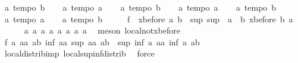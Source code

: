 \begin{isabellebody}
\ a{}{\isacharcolon}\ {\isachardoublequoteopen}tempo{}\ b{\isachardoublequoteclose}\isanewline
\ \ \isamarkupfalse%
\ a{}{\isacharcolon}\ {\isachardoublequoteopen}tempo{}\ a{\isachardoublequoteclose}\isanewline
\ \ \isamarkupfalse%
\ a{}{\isacharcolon}\ {\isachardoublequoteopen}tempo{}\ b{\isachardoublequoteclose}\isanewline
\ \ \isamarkupfalse%
\ a{}{\isacharcolon}\ {\isachardoublequoteopen}tempo{}\ a{\isachardoublequoteclose}\isanewline
\ \ \isamarkupfalse%
\ a{}{\isacharcolon}\ {\isachardoublequoteopen}tempo{}\ b{\isachardoublequoteclose}\isanewline
\ \ \isamarkupfalse%
\ a{}{\isacharcolon}\ {\isachardoublequoteopen}tempo{}\ a{\isachardoublequoteclose}\isanewline
\ \ \isamarkupfalse%
\ a{}{\isacharcolon}\ {\isachardoublequoteopen}tempo{}\ b{\isachardoublequoteclose}\isanewline
\ \ \isamarkupfalse%
\ \isamarkupfalse%
\ f{}{}{\isacharcolon}\ {\isachardoublequoteopen}{\isacharminus}\ xbefore\ a\ b\ {\isacharequal}\ sup\ {\isacharparenleft}sup\ {\isacharparenleft}{\isacharminus}\ a{\isacharparenright}\ {\isacharparenleft}{\isacharminus}\ b{\isacharparenright}{\isacharparenright}\ {\isacharparenleft}xbefore\ b\ a{\isacharparenright}{\isachardoublequoteclose}\isanewline
\ \ \ \ \isamarkupfalse%
\ a{}\ a{}\ a{}\ a{}\ a{}\ a{}\ a{}\ a{}\ \isamarkupfalse%
\ {\isacharparenleft}meson\ local{\isachardot}not{\isacharunderscore}xbefore{\isacharparenright}\isanewline
\ \ \isamarkupfalse%
\ f{}{}{\isacharcolon}\ {\isachardoublequoteopen}{\isasymforall}a\ aa\ ab{\isachardot}\ inf\ {\isacharparenleft}a{\isacharcolon}{\isacharcolon}{\isacharprime}a{\isacharparenright}\ {\isacharparenleft}sup\ aa\ ab{\isacharparenright}\ {\isacharequal}\ sup\ {\isacharparenleft}inf\ a\ aa{\isacharparenright}\ {\isacharparenleft}inf\ a\ ab{\isacharparenright}{\isachardoublequoteclose}\isanewline
\ \ \ \ \isamarkupfalse%
\ local{\isachardot}distrib{\isacharunderscore}imp{}\ local{\isachardot}sup{\isacharunderscore}inf{\isacharunderscore}distrib{}\ \isamarkupfalse%
\ force\isanewline
\ \ \isamarkupfalse%
\ \isamarkupfalse%

\end{isabellebody}
